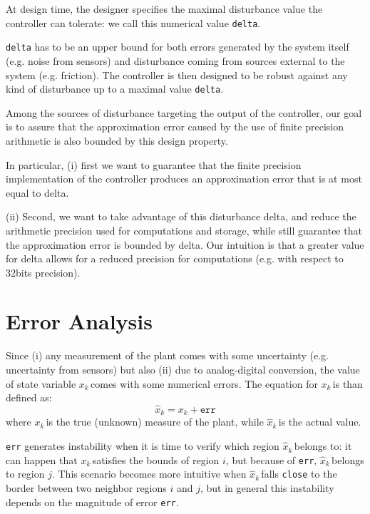 \documentclass[sigconf]{acmart}
\newcommand{\statevar}{x_{k}}
\newcommand{\statevarmath}{$x_{k}\,$}
\newcommand{\qstatevar}{\hat{x}_{k}}
\newcommand{\qstatevarmath}{$\hat{x}_{k}\,$}
\begin{document}
At design time, the designer specifies the maximal disturbance value the controller can tolerate: we call this numerical value \texttt{delta}. 

\texttt{delta} has to be an upper bound for both errors generated by the system itself (e.g. noise from sensors) and disturbance coming from sources external to the system (e.g. friction). The controller is then designed to be robust against any kind of disturbance up to a maximal value \texttt{delta}.

Among the sources of disturbance targeting the output of the controller, our goal is to assure that the approximation error caused by the use of finite precision arithmetic is also bounded by this design property.

In particular, (i) first we want to guarantee that the finite precision implementation of the controller produces an approximation error that is at most equal to delta.

(ii) Second, we want to take advantage of this disturbance delta, and reduce the arithmetic precision used for computations and storage, while still guarantee that the approximation error is bounded by delta. Our intuition is that a greater value for delta allows for a reduced precision for computations (e.g. with respect to 32bits precision).

\section{Error Analysis}
Since (i) any measurement of the plant comes with some uncertainty (e.g. uncertainty from sensors) but also (ii) due to analog-digital conversion, the value of state variable \statevarmath comes with some numerical errors. The equation for \statevarmath is than defined as:
\begin{equation}
\qstatevar=\statevar + \texttt{err}
\end{equation}
where \statevarmath is the true (unknown) measure of the plant, while \qstatevarmath is the actual value.

\texttt{err} generates instability when it is time to verify which region \qstatevarmath belongs to: it can happen that \statevarmath satisfies the bounds of region $i$, but because of \texttt{err}, \qstatevarmath belongs to region $j$. This scenario becomes more intuitive when \qstatevarmath falls \texttt{close} to the border between two neighbor regions $i$ and $j$, but in general this instability depends on the magnitude of error \texttt{err}.
\end{document}
